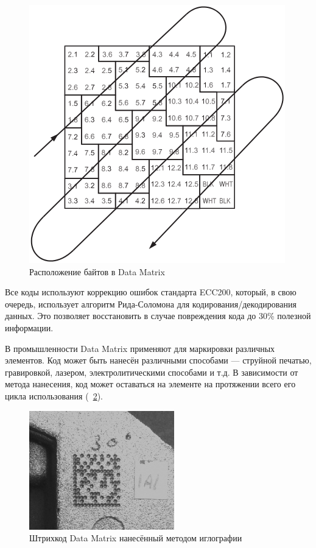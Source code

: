 \begin{figure}[htb]
    \centering
    \includegraphics[scale=0.8]{img/dm_coding}
    \caption{Расположение байтов в Data Matrix}
    \label{fig:dmCoding}
\end{figure}

Все коды используют коррекцию ошибок стандарта ECC200, 
который, в свою очередь, использует алгоритм Рида-Соломона для 
кодирования/декодирования данных. Это позволяет восстановить в случае 
повреждения кода до 30\% полезной информации.

В промышленности Data Matrix применяют для маркировки различных элементов. 
Код может быть нанесён различными способами --- струйной печатью, гравировкой, 
лазером, электролитическими способами и т.д. В зависимости от метода нанесения, 
код может оставаться на элементе на протяжении всего его цикла 
использования (\figurename\ \ref{fig:dmSample2}).

\begin{figure}[htb]
    \centering
    \includegraphics[scale=0.7]{img/dm_sample2}
    \caption{Штрихкод Data Matrix нанесённый методом иглографии}
    \label{fig:dmSample2}
\end{figure}

